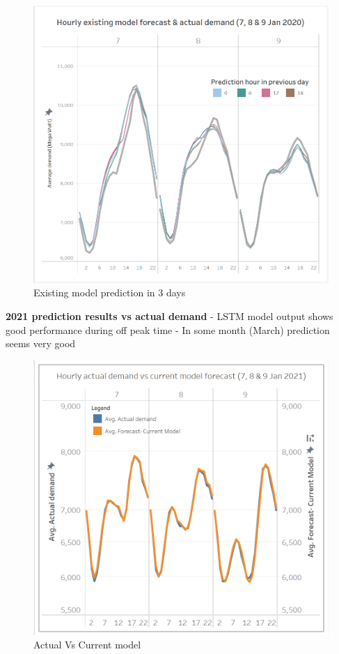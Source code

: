 \documentclass[mstat,12pt]{unswthesis}
\begin{document}
\begin{figure}[H]
\includegraphics{snapshots1/Existing model prediction in 3 days.png}
\caption{Existing model prediction in 3 days}\label{4.6}
\end{figure}

\textbf{2021 prediction results vs actual demand} \newline \newline -
LSTM model output shows good performance during off peak time \newline -
In some month (March) prediction seems very good

\begin{figure}[H]
\includegraphics{snapshots1/Actual Vs Current model.png}
\caption{Actual Vs Current model}\label{4.8}
\end{figure}
\end{document}
